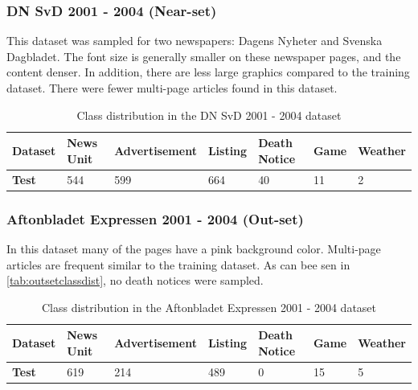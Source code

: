 \documentclass[oneside, english, bibtex]{kththesis}
\begin{document}
\subsubsection{DN SvD 2001 - 2004 (Near-set)}
\label{subsub:nearset}

This dataset was sampled for two newspapers: Dagens Nyheter and Svenska Dagbladet. The font size is generally smaller on these newspaper pages, and the content denser. In addition, there are less large graphics compared to the training dataset. There were fewer multi-page articles found in this dataset.

\begin{table}[H]
  \begin{center}
    \caption{Class distribution in the  DN SvD 2001 - 2004 dataset}
    \label{tab:insetclassdist}
    \begin{tabular}{l|l|l|l|l|l|l} %
    \textbf{Dataset} & \textbf{News Unit} & \textbf{Advertisement} & \textbf{Listing} & \textbf{Death Notice} & \textbf{Game} & \textbf{Weather}  \\
    \hline
    \textbf{Test} & 544 & 599 & 664 & 40 & 11 & 2 \\    \hline
    \end{tabular}
  \end{center}
\end{table}

\subsubsection{Aftonbladet Expressen 2001 - 2004 (Out-set)}
\label{subsub:outset}

In this dataset many of the pages have a pink background color. Multi-page articles are frequent similar to the training dataset. As can bee sen in \autoref{tab:outsetclassdist}, no death notices were sampled. 

\begin{table}[H]
  \begin{center}
    \caption{Class distribution in the Aftonbladet Expressen 2001 - 2004 dataset}
    \label{tab:outsetclassdist}
    \begin{tabular}{l|l|l|l|l|l|l} %
    \textbf{Dataset} & \textbf{News Unit} & \textbf{Advertisement} & \textbf{Listing} & \textbf{Death Notice} & \textbf{Game} & \textbf{Weather}  \\
    \hline
    \textbf{Test} & 619 & 214 & 489 & 0 & 15 & 5 \\    \hline
    \end{tabular}
  \end{center}
\end{table}
\end{document}
